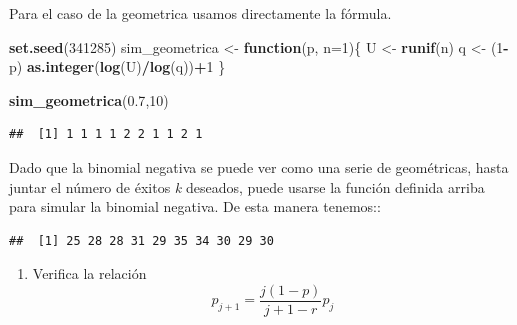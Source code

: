 \documentclass[]{article}
\newenvironment{Shaded}{\begin{snugshade}}{\end{snugshade}}
\newcommand{\ControlFlowTok}[1]{\textcolor[rgb]{0.13,0.29,0.53}{\textbf{#1}}}
\newcommand{\DataTypeTok}[1]{\textcolor[rgb]{0.13,0.29,0.53}{#1}}
\newcommand{\DecValTok}[1]{\textcolor[rgb]{0.00,0.00,0.81}{#1}}
\newcommand{\FloatTok}[1]{\textcolor[rgb]{0.00,0.00,0.81}{#1}}
\newcommand{\KeywordTok}[1]{\textcolor[rgb]{0.13,0.29,0.53}{\textbf{#1}}}
\newcommand{\NormalTok}[1]{#1}
\newcommand{\OperatorTok}[1]{\textcolor[rgb]{0.81,0.36,0.00}{\textbf{#1}}}
\newcommand{\StringTok}[1]{\textcolor[rgb]{0.31,0.60,0.02}{#1}}
\providecommand{\tightlist}{%
  \setlength{\itemsep}{0pt}\setlength{\parskip}{0pt}}
\begin{document}
Para el caso de la geometrica usamos directamente la fórmula.

\begin{Shaded}
\begin{Highlighting}[]
\KeywordTok{set.seed}\NormalTok{(}\DecValTok{341285}\NormalTok{)}
\NormalTok{sim_geometrica <-}\StringTok{ }\ControlFlowTok{function}\NormalTok{(p, }\DataTypeTok{n=}\DecValTok{1}\NormalTok{)\{}
\NormalTok{  U <-}\StringTok{ }\KeywordTok{runif}\NormalTok{(n)}
\NormalTok{  q <-}\StringTok{ }\NormalTok{(}\DecValTok{1}\OperatorTok{-}\NormalTok{p)}
  \KeywordTok{as.integer}\NormalTok{(}\KeywordTok{log}\NormalTok{(U)}\OperatorTok{/}\KeywordTok{log}\NormalTok{(q))}\OperatorTok{+}\DecValTok{1}
\NormalTok{\}}

\KeywordTok{sim_geometrica}\NormalTok{(}\FloatTok{0.7}\NormalTok{,}\DecValTok{10}\NormalTok{)  }
\end{Highlighting}
\end{Shaded}

\begin{verbatim}
##  [1] 1 1 1 1 2 2 1 1 2 1
\end{verbatim}

Dado que la binomial negativa se puede ver como una serie de
geométricas, hasta juntar el número de éxitos \emph{k} deseados, puede
usarse la función definida arriba para simular la binomial negativa. De
esta manera tenemos::

\begin{Shaded}
\end{Shaded}

\begin{verbatim}
##  [1] 25 28 28 31 29 35 34 30 29 30
\end{verbatim}

\begin{enumerate}
\def\labelenumi{\alph{enumi})}
\setcounter{enumi}{2}
\tightlist
\item
  Verifica la relación \[p_{j+1}=\frac{j(1-p)}{j+1-r}p_j\]
\end{enumerate}
\end{document}
